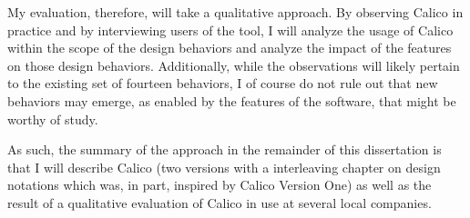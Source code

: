 My evaluation, therefore, will take a qualitative approach. By observing Calico in practice and by interviewing users of the tool, I will analyze the usage of Calico within the scope of the design behaviors and analyze the impact of the features on those design behaviors. Additionally, while the observations will likely pertain to the existing set of fourteen behaviors, I of course do not rule out that new behaviors may emerge, as enabled by the features of the software, that might be worthy of study. 

As such, the summary of the approach in the remainder of this dissertation is that I will describe Calico (two versions with a interleaving chapter on design notations which was, in part, inspired by Calico Version One) as well as the result of a qualitative evaluation of Calico in use at several local companies.

